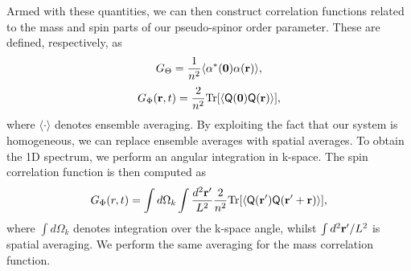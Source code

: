 Armed with these quantities, we can then construct correlation functions related
to the mass and spin parts of our pseudo-spinor order parameter.
These are defined, respectively, as
\begin{equation}
    G_\Theta = \frac{1}{n^2}\langle \alpha^*(\vb{0})\alpha(\vb{r}) \rangle,
\end{equation}
\begin{equation}
    G_\Phi(\vb{r}, t) =
    \frac{2}{n^2}\mathrm{Tr}
    [\langle \mathsf{Q}(\vb{0})\mathsf{Q}(\vb{r})\rangle],
\end{equation}
where \( \langle \cdot \rangle \) denotes ensemble averaging.
By exploiting the fact that our system is homogeneous, we can replace ensemble
averages with spatial averages.
To obtain the 1D spectrum, we perform an angular integration in k-space.
The spin correlation function is then computed as
\begin{equation}
    G_\Phi(r, t) = \int d\Omega_k \int \frac{d^2\vb{r}^\prime}{L^2}
    \frac{2}{n^2}\text{Tr}
    [\langle \mathsf{Q}(\vb{r}^\prime)\mathsf{Q}(\vb{r}^\prime+\vb{r})\rangle],
\end{equation}
where \(\int d\Omega_k\) denotes integration over the k-space angle, whilst
\(\int d^2\vb{r}'/L^2\) is spatial averaging.
We perform the same averaging for the mass correlation function.

